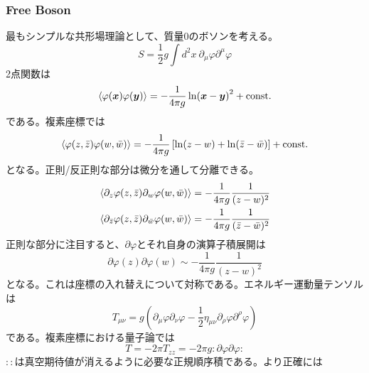 \documentclass[11pt, aps, longbibliography]{article}
\numberwithin{equation}{section}
\begin{document}
    \subsubsection{Free Boson}
        最もシンプルな共形場理論として、質量0のボソンを考える。
        \begin{equation}\label{eq:free-boson1}
            S = \frac{1}{2}g \int d^2x \ \partial_\mu \varphi \partial^\mu \varphi
        \end{equation}
        2点関数は
        \begin{equation}\label{eq:free-boson2}
            \expval{\varphi(\bm{x})\varphi(\bm{y})} = -\frac{1}{4\pi g} \ln (\bm{x}-\bm{y})^2 + \text{const.}
        \end{equation}
        である。複素座標では
        \begin{equation}\label{eq:free-boson3}
            \expval{\varphi(z,\bar{z})\varphi(w,\bar{w})} = -\frac{1}{4\pi g}\left[ \ln(z-w) + \ln(\bar{z}-\bar{w}) \right]+ \text{const.}
        \end{equation}
        となる。正則/反正則な部分は微分を通して分離できる。
        \begin{align}\label{eq:free-boson4}
            \expval{\partial_z \varphi(z,\bar{z})\partial_w\varphi(w,\bar{w})} &= -\frac{1}{4\pi g}\frac{1}{(z-w)^2} \\
            \expval{\partial_{\bar{z}} \varphi(z,\bar{z})\partial_{\bar{w}}\varphi(w,\bar{w})} &= -\frac{1}{4\pi g}\frac{1}{(\bar{z}-\bar{w})^2}
        \end{align}
        正則な部分に注目すると、$\partial \varphi$とそれ自身の演算子積展開は
        \begin{equation}\label{eq:free-boson5}
            \partial \varphi(z) \partial\varphi(w) \sim -\frac{1}{4\pi g}\frac{1}{(z-w)^2}
        \end{equation}
        となる。これは座標の入れ替えについて対称である。エネルギー運動量テンソルは
        \begin{equation}\label{eq:free-boson6}
            T_{\mu\nu} = g\left( \partial_\mu \varphi \partial_\nu \varphi - \frac{1}{2}\eta_{\mu\nu}\partial_\rho \varphi \partial^\rho \varphi \right)
        \end{equation}
        である。複素座標における量子論では
        \begin{equation}\label{eq:free-boson7}
            T = -2\pi T_{zz} = -2\pi g : \partial \varphi \partial \varphi: 
        \end{equation}
        $::$は真空期待値が消えるように必要な正規順序積である。より正確には
\end{document}
